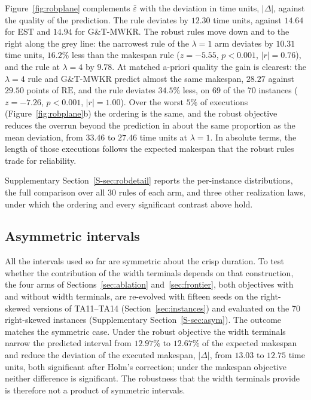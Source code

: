 \documentclass[review,authoryear,11pt]{elsarticle}
\newcommand{\RE}{\mathrm{RE}}
\begin{document}
Figure~\ref{fig:robplane} complements $\bar\varepsilon$ with the
deviation in time units, $|\Delta|$, against the quality of the
prediction. The rule deviates by $12.30$ time units, against $14.64$ for
EST and $14.94$ for G\&T-MWKR. The robust rules move down and to the right along the grey
line: the narrowest rule of the $\lambda{=}1$ arm deviates by $10.31$
time units, $16.2\%$ less than the makespan rule ($z=-5.55$, $p<0.001$,
$|r|=0.76$), and the rule at $\lambda{=}4$ by $9.78$. At matched a-priori
quality the gain is clearest: the $\lambda{=}4$ rule and G\&T-MWKR
predict almost the same makespan, $28.27$ against $29.50$ points of
$\RE$, and the rule deviates $34.5\%$ less, on 69 of the 70 instances
($z=-7.26$, $p<0.001$, $|r|=1.00$). Over the worst $5\%$ of executions
(Figure~\ref{fig:robplane}b) the ordering is the same, and the robust
objective reduces the overrun beyond the prediction in about the same
proportion as the mean deviation, from $33.46$ to $27.46$ time units at
$\lambda{=}1$. In absolute terms, the length of those executions follows
the expected makespan that the robust rules trade for reliability.

Supplementary Section~\ref{S-sec:robdetail} reports the per-instance
distributions, the full comparison over all 30 rules of each arm, and
three other realization laws, under which the ordering and every significant
contrast above hold.

\subsection{Asymmetric intervals}
\label{sec:asym}

All the intervals used so far are symmetric about the crisp duration.
To test whether the contribution of the width terminals depends on that
construction, the four arms of Sections~\ref{sec:ablation}
and~\ref{sec:frontier}, both objectives with and without width
terminals, are re-evolved with fifteen seeds on the right-skewed
versions of TA11--TA14 (Section~\ref{sec:instances}) and evaluated on
the 70 right-skewed instances (Supplementary Section~\ref{S-sec:asym}).
The outcome matches the symmetric case. Under the robust objective the
width terminals narrow the predicted interval from $12.97\%$ to
$12.67\%$ of the expected makespan and reduce the deviation of the
executed makespan, $|\Delta|$, from $13.03$ to $12.75$ time units, both
significant after Holm's correction; under the makespan objective
neither difference is significant. The robustness that the width
terminals provide is therefore not a product of symmetric intervals.
\end{document}
